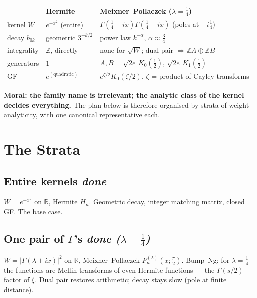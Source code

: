 \documentclass[11pt,a4paper]{article}
\newcommand{\R}{\mathbb{R}}
\newcommand{\Z}{\mathbb{Z}}
\begin{document}
\begin{center}
\begin{tabular}{@{}lll@{}}
\toprule
 & Hermite & Meixner--Pollaczek ($\lambda=\tfrac14$) \\
\midrule
kernel $W$      & $e^{-x^2}$ (entire) & $\Gamma(\tfrac14+ix)\Gamma(\tfrac14-ix)$ (poles at $\pm i\tfrac14$) \\
decay $b_{0k}$  & geometric $3^{-k/2}$ & power law $k^{-\alpha}$, $\alpha\approx\tfrac34$ \\
integrality     & $\Z$, directly & none for $\sqrt{W}$; dual pair $\Rightarrow \Z A \oplus \Z B$ \\
generators      & $1$ & $A,B = \sqrt{2e}\,K_0(\tfrac12),\,\sqrt{2e}\,K_1(\tfrac12)$ \\
GF              & $e^{(\text{quadratic})}$ & $e^{\zeta/2}K_0(\zeta/2)$, $\zeta$ = product of Cayley transforms \\
\bottomrule
\end{tabular}
\end{center}

\noindent
\textbf{Moral: the family name is irrelevant; the analytic class of the
kernel decides everything.} The plan below is therefore organised by
strata of weight analyticity, with one canonical representative each.

\section{The Strata}

\subsection{Entire kernels \hfill \normalfont\emph{done}}

$W = e^{-x^2}$ on $\R$, Hermite $H_n$. Geometric decay, integer
matching matrix, closed GF. The base case.

\subsection{One pair of $\Gamma$'s \hfill \normalfont\emph{done ($\lambda=\tfrac14$)}}

$W = |\Gamma(\lambda+ix)|^2$ on $\R$, Meixner--Pollaczek
$P_n^{(\lambda)}(x;\tfrac\pi2)$. Bump--Ng: for $\lambda=\tfrac14$ the
functions are Mellin transforms of even Hermite functions --- the
$\Gamma(s/2)$ factor of $\xi$. Dual pair restores arithmetic; decay
stays slow (pole at finite distance).
\end{document}
